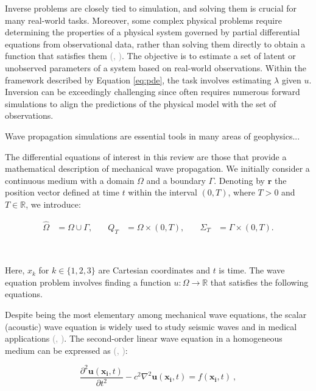 \documentclass[11pt,twoside]{article}
\renewcommand{\citep}[2][]{\textcolor{gray}{(\citeauthor{#2}, \citeyear[#1]{#2})}}
\begin{document}
Inverse problems are closely tied to simulation, and solving them is crucial for many real-world tasks. Moreover, some complex physical problems require determining the properties of a physical system governed by partial differential equations from observational data, rather than solving them directly to obtain a function that satisfies them \citep{galiounas_battery_2022, ren_seismicnet_2024,mccann_convolutional_2017}. The objective is to estimate a set of latent or unobserved parameters of a system based on real-world observations. Within the framework described by Equation \ref{eq:pde}, the task involves estimating $\lambda$ given $u$. Inversion can be exceedingly challenging since often requires numerous forward simulations to align the predictions of the physical model with the set of observations. 


Wave propagation simulations are essential tools in many areas of geophysics...


The differential equations of interest in this review are those that provide a mathematical description of mechanical wave propagation. We initially consider a continuous medium with a domain $\Omega$ and a boundary $\Gamma$. Denoting by $\mathbf{r}$ the position vector defined at time $t$ within the interval $(0, T)$, where $T > 0$ and $T \in \mathbb{R}$, we introduce:

\[
\begin{aligned}
\hat{\Omega} &= \Omega \cup \Gamma, &\quad
Q_T &= \Omega \times (0,T), &\quad
\Sigma_T &= \Gamma \times (0,T).
\end{aligned}
\]

\

Here, $x_k$ for $k \in \{1, 2, 3\}$ are Cartesian coordinates and $t$ is time. The wave equation problem involves finding a function \( u : \Omega \to \mathbb{R} \) that satisfies the following equations.

Despite being the most elementary among mechanical wave equations, the scalar (acoustic) wave equation is widely used to study seismic waves and in medical applications \citep{moseley_physics-informed_2022, alkhadhr_wave_2023}. The second-order linear wave equation in a homogeneous medium can be expressed as \citep{Carcione2002}:

\begin{equation}
\frac{\partial^2 \boldsymbol{u}(\boldsymbol{x_i}, t)}{\partial t^2} - c^{2} \nabla^2 \boldsymbol{u}(\boldsymbol{x_i}, t) = f(\boldsymbol{x_i}, t) \ ,
\label{acoustic}
\end{equation}
\end{document}
